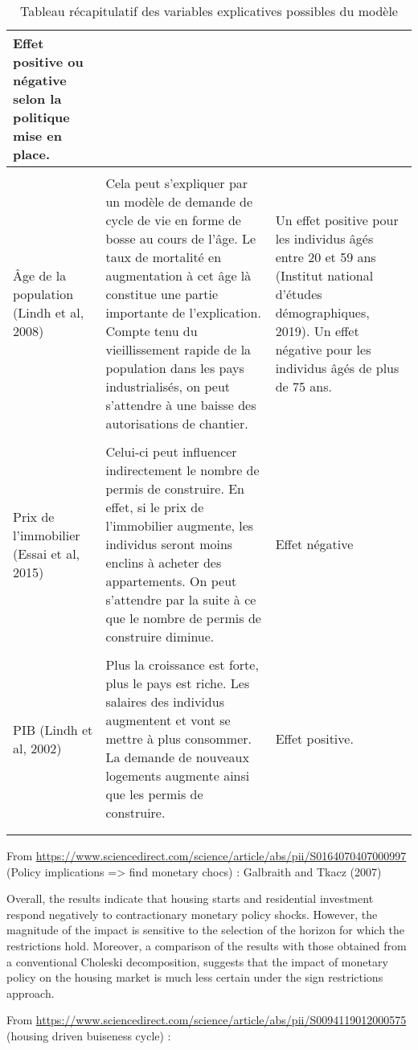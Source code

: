 \documentclass[11pt,]{article}
\begin{document}
\begin{longtable}{p{5cm} | p{5cm} | p{5cm}}
        Effet positive ou négative selon la politique mise en place. \\
\hline \\[-1.8ex]
Âge de la population (Lindh et al, 2008) &
    Cela peut s’expliquer par un modèle de demande de cycle de vie en forme de bosse au cours de l’âge. Le taux de mortalité en augmentation à cet âge là constitue une partie importante de l’explication. Compte tenu du vieillissement rapide de la population dans les pays industrialisés, on peut s’attendre à une baisse des autorisations de chantier. & 
        Un effet positive pour les individus âgés entre 20 et 59 ans (Institut national d’études démographiques, 2019). Un effet négative pour les individus âgés de plus de 75 ans. \\
\hline \\[-1.8ex]
Prix de l’immobilier (Essai et al, 2015) &
    Celui-ci peut influencer indirectement le nombre de permis de construire. En effet, si le prix de l’immobilier augmente, les individus seront moins enclins à acheter des appartements. On peut s’attendre par la suite à ce que le nombre de permis de construire diminue. &
        Effet négative \\
\hline \\[-1.8ex]
PIB (Lindh et al, 2002) & 
    Plus la croissance est forte, plus le pays est riche. Les salaires des individus augmentent et vont se mettre à plus consommer. La demande de nouveaux logements augmente ainsi que les permis de construire. & 
        Effet positive. \\
\hline \\[-1.8ex]
\caption{Tableau récapitulatif des variables explicatives possibles du modèle}
\end{longtable}

From
\url{https://www.sciencedirect.com/science/article/abs/pii/S0164070407000997}
(Policy implications =\textgreater{} find monetary chocs) : Galbraith
and Tkacz (2007)

Overall, the results indicate that housing starts and residential
investment respond negatively to contractionary monetary policy shocks.
However, the magnitude of the impact is sensitive to the selection of
the horizon for which the restrictions hold. Moreover, a comparison of
the results with those obtained from a conventional Choleski
decomposition, suggests that the impact of monetary policy on the
housing market is much less certain under the sign restrictions
approach.

From
\url{https://www.sciencedirect.com/science/article/abs/pii/S0094119012000575}
(housing driven buiseness cycle) :
\end{document}
